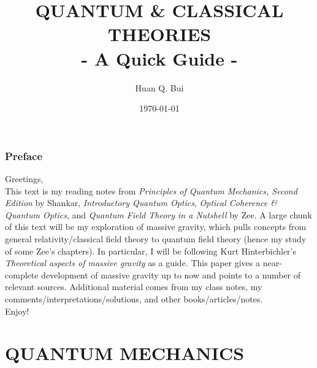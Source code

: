 \documentclass{book}
\theoremstyle{definition}
\begin{document}
\begin{titlepage}\centering
 \clearpage
 \title{{\textsc{\textbf{QUANTUM \& CLASSICAL THEORIES}}}\\ \smallskip - A Quick Guide - \\}
 \author{\bigskip Huan Q. Bui}
 \date{\today}
 \maketitle
 \thispagestyle{empty}
\end{titlepage}

\subsection*{Preface}

Greetings,\\

This text is my reading notes from \textit{Principles of Quantum Mechanics, Second Edition} by Shankar, \textit{Introductory Quantum Optics}, \textit{Optical Coherence \& Quantum Optics}, and \textit{Quantum Field Theory in a Nutshell} by Zee. A large chunk of this text will be my exploration of massive gravity, which pulls concepts from general relativity/classical field theory to quantum field theory (hence my study of some Zee's chapters). In particular, I will be following Kurt Hinterbichler's \textit{Theoretical aspects of massive gravity} as a guide. This paper gives a near-complete development of massive gravity up to now and points to a number of relevant sources. Additional material comes from my class notes, my comments/interpretations/solutions, and other books/articles/notes. \\

Enjoy!

\newpage
\tableofcontents
\newpage





\chapter{QUANTUM MECHANICS}
\end{document}
